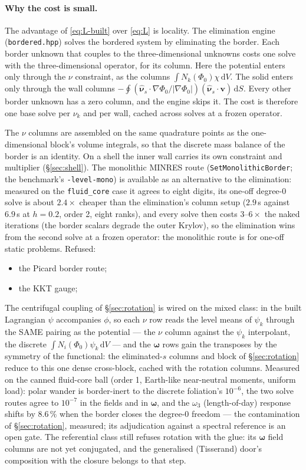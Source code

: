 \documentclass[11pt]{article}
\theoremstyle{definition}
\theoremstyle{remark}
\newcommand{\bv}{\mathbf{v}}
\newcommand{\bomega}{\boldsymbol{\omega}}
\newcommand{\dS}{\,\mathrm{d}S}
\newcommand{\dV}{\,\mathrm{d}V}
\newcommand{\code}[1]{\texttt{#1}}
\newcommand{\nuhs}{\hat{\boldsymbol{\nu}}_s}
\begin{document}
\paragraph{Why the cost is small.} The advantage of
\eqref{eq:L-built} over \eqref{eq:L} is locality. The elimination
engine (\code{bordered.hpp}) solves the bordered system by eliminating
the border. Each border unknown that couples to the three-dimensional
unknowns costs one solve with the three-dimensional operator, for its
column. Here the potential enters only through the $\nu$ constraint,
as the columns $\int N_k(\Phi_0)\chi\dV$. The solid enters only
through the wall columns $-\oint(\nuhs\cdot\nabla\Phi_0/
|\nabla\Phi_0|)(\nuhs\cdot\bv)\dS$. Every other border unknown has
a zero column, and the engine skips it. The cost is therefore one base
solve per $\nu_k$ and per wall, cached across solves at a frozen
operator.

The $\nu$ columns are assembled on the same quadrature points as the
one-dimensional block's volume integrals, so that the discrete mass
balance of the border is an identity. On a shell the inner wall
carries its own constraint and multiplier (\S\ref{sec:shell}). The
monolithic MINRES route (\code{SetMonolithicBorder}; the benchmark's
\code{-level-mono}) is available as an alternative to the elimination:
measured on the \code{fluid\_core} case it agrees to eight digits, its
one-off degree-0 solve is about $2.4\times$ cheaper than the
elimination's column setup ($2.9$\,s against $6.9$\,s at $h = 0.2$,
order 2, eight ranks), and every solve then costs $3$--$6\times$ the
naked iterations (the border scalars degrade the outer Krylov), so the
elimination wins from the second solve at a frozen operator: the
monolithic route is for one-off static problems. Refused:
\begin{itemize}
\item the Picard border route;
\item the KKT gauge;

\end{itemize}
The centrifugal coupling of \S\ref{sec:rotation} is wired on the mixed
class: in the built Lagrangian $\psi$ accompanies $\phi$, so each
$\nu$ row reads the level means of $\psi_k$ through the SAME pairing
as the potential --- the $\nu$ column against the $\psi_k$ interpolant,
the discrete $\int N_i(\Phi_0)\psi_k\dV$ --- and the $\bomega$ rows
gain the transposes by the symmetry of the functional: the
eliminated-$s$ columns and block of \S\ref{sec:rotation} reduce to
this one dense cross-block, cached with the rotation columns. Measured
on the canned fluid-core ball (order 1, Earth-like near-neutral
moments, uniform load): polar wander is border-inert to the discrete
foliation's $10^{-6}$, the two solve routes agree to $10^{-7}$ in the
fields and in $\bomega$, and the $\omega_3$ (length-of-day) response
shifts by $8.6\,\%$ when the border closes the degree-0 freedom ---
the contamination of \S\ref{sec:rotation}, measured; its adjudication
against a spectral reference is an open gate. The referential class
still refuses rotation with the glue: its $\bomega$ field columns are
not yet conjugated, and the generalised (Tisserand) door's composition
with the closure belongs to that step.
\end{document}
